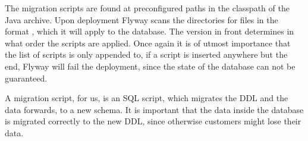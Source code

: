 The migration scripts are found at preconfigured paths in the classpath of the Java archive.
Upon deployment Flyway scans the directories for files in the format , which it will apply to the database.
The version in front determines in what order the scripts are applied.
Once again it is of utmost importance that the list of scripts is only appended to, if a script is inserted anywhere but the end, Flyway will fail the deployment, since the state of the database can not be guaranteed.

A migration script, for us, is an SQL script, which migrates the \ac{DDL} and the data forwards, to a new schema.
It is important that the data inside the database is migrated correctly to the new \ac{DDL}, since otherwise customers might lose their data.
